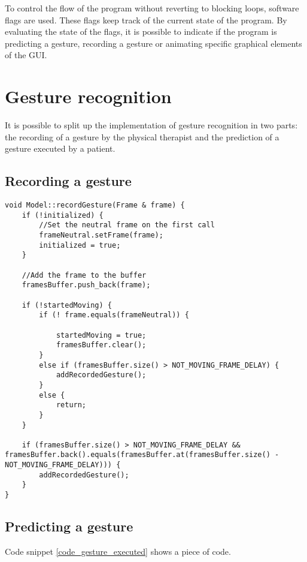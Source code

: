 To control the flow of the program without reverting to blocking loops, software flags are used. These flags keep track of the current state of the program. By evaluating the state of the flags, it is possible to indicate if the program is predicting a gesture, recording a gesture or animating specific graphical elements of the GUI.


\section{Gesture recognition}

It is possible to split up the implementation of gesture recognition in two parts: the recording of a gesture by the physical therapist and the prediction of a gesture executed by a patient.


\subsection{Recording a gesture}

\begin{lstlisting}[caption=method to record a gesture, label=code_record_gesture]
void Model::recordGesture(Frame & frame) {
	if (!initialized) {
		//Set the neutral frame on the first call
		frameNeutral.setFrame(frame);
		initialized = true;
	}
	
	//Add the frame to the buffer
	framesBuffer.push_back(frame);

	if (!startedMoving) {
		if (! frame.equals(frameNeutral)) {
		
			startedMoving = true;
			framesBuffer.clear();
		}
		else if (framesBuffer.size() > NOT_MOVING_FRAME_DELAY) {
			addRecordedGesture();
		}
		else {
			return;
		}
	}

	if (framesBuffer.size() > NOT_MOVING_FRAME_DELAY &&	framesBuffer.back().equals(framesBuffer.at(framesBuffer.size() - NOT_MOVING_FRAME_DELAY))) {
		addRecordedGesture();
	}
}
\end{lstlisting}


\subsection{Predicting a gesture}

Code snippet \ref{code_gesture_executed} shows a piece of code.

